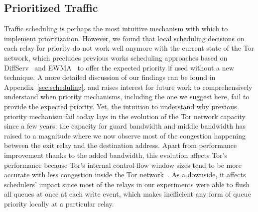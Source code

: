 \subsection{Prioritized Traffic}
\label{subsub:prioritized}

Traffic scheduling is
perhaps the most intuitive mechanism with which to implement
prioritization. However, we found that local scheduling decisions on each relay for 
priority do not work well anymore with the current state of the Tor network, which 
precludes previous works scheduling approaches based on 
DiffServ~\cite{dovrolis1999case} and EWMA~\cite{tang2010improved} to offer the 
expected priority if used without a new technique. A more detailed
discussion of our findings can be found in Appendix~\ref{sec:scheduling}, and raises 
interest for future work to comprehensively understand when priority mechanisms, 
including the one we suggest here, fail to provide the expected priority. Yet, the 
intuition to understand why previous priority mechanism fail today lays in the 
evolution of the Tor network capacity since a few years: the capacity for guard 
bandwidth and middle bandwidth has raised to a magnitude where we now observe most 
of the congestion happening between the exit relay and the destination address. 
Apart from performance improvement thanks to the added bandwidth, this evolution 
affects Tor's performance because Tor's internal control-flow window sizes tend to 
be more accurate with less congestion inside the Tor network~\cite{archive-2009-
mail,kiraly2008solving}. As a downside, it affects schedulers' impact since most of 
the relays in our experiments were able to flush all queues at once at each write 
event, which makes inefficient any form of queue priority locally at a particular 
relay.

